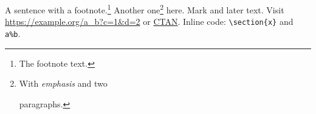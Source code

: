 \documentclass{article}
\begin{document}
A sentence with a footnote.\footnote{The footnote text.} Another one\footnote{With \emph{emphasis} and two

paragraphs.} here.
Mark\footnotemark{} and later text.
Visit \url{https://example.org/a_b?c=1&d=2} or \href{https://ctan.org}{CTAN}.
Inline code: \verb|\section{x}| and \verb+a%b+.
\end{document}

